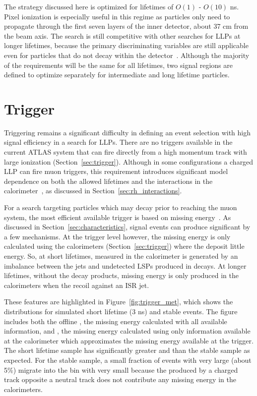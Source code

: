The strategy discussed here is optimized for lifetimes of $O(1)$ - $O(10)$ ns. 
Pixel ionization is especially useful in this regime as particles only need to propagate through the first seven layers of the inner detector, about 37 cm from the beam axis. 
The search is still competitive with other searches for \acp{LLP} at longer lifetimes, because the primary discriminating variables are still applicable even for particles that do not decay within the detector~\cite{stable2016}. 
Although the majority of the requirements will be the same for all lifetimes, two signal regions are defined to optimize separately for intermediate and long lifetime particles.



\section{Trigger}

Triggering remains a significant difficulty in defining an event selection with high signal efficiency in a search for \acp{LLP}. 
There are no triggers available in the current ATLAS system that can fire directly from a high momentum track with large ionization (Section~\ref{sec:trigger}). 
Although in some configurations a charged \ac{LLP} can fire muon triggers, this requirement introduces significant model dependence on both the allowed lifetimes and the interactions in the calorimeter~\cite{rhad_atlas}, as discussed in Section~\ref{sec:rh_interactions}.

For a search targeting particles which may decay prior to reaching the muon system, the most efficient available trigger is based on missing energy~\cite{rhad_atlas}.
As discussed in Section~\ref{sec:characteristics}, signal events can produce significant \met by a few mechanisms.
At the trigger level however, the missing energy is only calculated using the calorimeters (Section~\ref{sec:trigger}) where the \rhadrons deposit little energy.
So, at short lifetimes, \met measured in the calorimeter is generated by an imbalance between the jets and undetected \acp{LSP} produced in \rhadron decays.
At longer lifetimes, without the decay products, missing energy is only produced in the calorimeters when the \rhadrons recoil against an \ac{ISR} jet.

These features are highlighted in Figure~\ref{fig:trigger_met}, which shows the \met distributions for simulated short lifetime (3 ns) and stable \rhadron events.
The figure includes both the offline \met, the missing energy calculated with all available information, and \calomet, the missing energy calculated using only information available at the calorimeter which approximates the missing energy available at the trigger.
The short lifetime sample has significantly greater \met and \calomet than the stable sample as expected.
For the stable sample, a small fraction of events with very large \met (about 5\%) migrate into the bin with very small \calomet because the \met produced by a charged \rhadron track opposite a neutral \rhadron track does not contribute any missing energy in the calorimeters.

